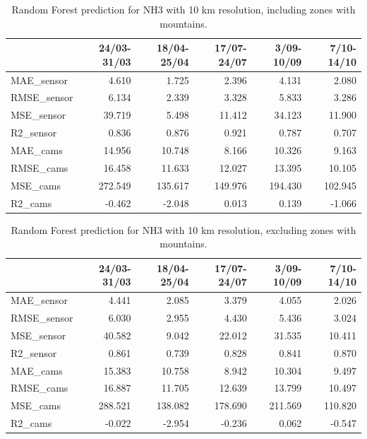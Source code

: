 \begin{table}[H]
\begin{tabular}{lrrrrr}
\toprule
  &  24/03-31/03 &  18/04-25/04 &  17/07-24/07 &  3/09-10/09 &  7/10-14/10 \\
\midrule
 MAE\_sensor &        4.610 &        1.725 &        2.396 &       4.131 &       2.080 \\
RMSE\_sensor &        6.134 &        2.339 &        3.328 &       5.833 &       3.286 \\
 MSE\_sensor &       39.719 &        5.498 &       11.412 &      34.123 &      11.900 \\
  R2\_sensor &        0.836 &        0.876 &        0.921 &       0.787 &       0.707 \\
   MAE\_cams &       14.956 &       10.748 &        8.166 &      10.326 &       9.163 \\
  RMSE\_cams &       16.458 &       11.633 &       12.027 &      13.395 &      10.105 \\
   MSE\_cams &      272.549 &      135.617 &      149.976 &     194.430 &     102.945 \\
    R2\_cams &       -0.462 &       -2.048 &        0.013 &       0.139 &      -1.066 \\
\bottomrule
\end{tabular}
\caption{Random Forest prediction for NH3 with 10 km resolution, including zones with mountains.}
\end{table}
\begin{table}[H]
\begin{tabular}{lrrrrr}
\toprule
 &  24/03-31/03 &  18/04-25/04 &  17/07-24/07 &  3/09-10/09 &  7/10-14/10 \\
\midrule
 MAE\_sensor &        4.441 &        2.085 &        3.379 &       4.055 &       2.026 \\
RMSE\_sensor &        6.030 &        2.955 &        4.430 &       5.436 &       3.024 \\
 MSE\_sensor &       40.582 &        9.042 &       22.012 &      31.535 &      10.411 \\
  R2\_sensor &        0.861 &        0.739 &        0.828 &       0.841 &       0.870 \\
   MAE\_cams &       15.383 &       10.758 &        8.942 &      10.304 &       9.497 \\
  RMSE\_cams &       16.887 &       11.705 &       12.639 &      13.799 &      10.497 \\
   MSE\_cams &      288.521 &      138.082 &      178.690 &     211.569 &     110.820 \\
    R2\_cams &       -0.022 &       -2.954 &       -0.236 &       0.062 &      -0.547 \\
\bottomrule
\end{tabular}
\caption{Random Forest prediction for NH3 with 10 km resolution, excluding zones with mountains.}
\end{table}
